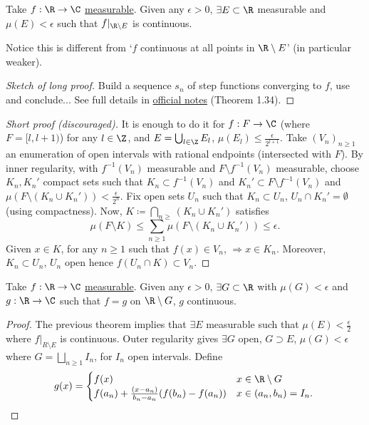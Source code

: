 \documentclass[twoside]{article}
\begin{document}
\begin{thm}
    Take $f: \R \to \C$ \hyperlink{def:measFunc}{measurable}.
    Given any $\epsilon > 0$, $\exists E \subset \R$ measurable and $\mu(E) < \epsilon$ such that $f|_{\R \setminus E}$ is continuous.
\end{thm}
\begin{remark}
    Notice this is different from `$f$ continuous at all points in $\R \setminus E$' (in particular weaker).
\end{remark}
\begin{proof}[Sketch of long proof]
    Build a sequence $s_n$ of step functions converging to $f$, use  and conclude... See full details in \href{https://cmouhot.files.wordpress.com/2017/01/notes-af-v21.pdf}{official notes} (Theorem 1.34).
\end{proof}
\begin{proof}[Short proof (discouraged)]
    It is enough to do it for $f: F \to \C$ (where $F = [l, l+1)$) for any $l \in \Z$, and $E = \bigcup_{l \in \Z} E_l$, $\mu(E_l) \leq \frac{\epsilon}{2^{l+1}}$.
    Take $(V_n)_{n \geq 1}$ an enumeration of open intervals with rational endpoints (intersected with $F$).
    By inner regularity, with $f^{-1}(V_n)$ measurable and $F \setminus f^{-1}(V_n)$ measurable, choose $K_n, K_n'$ compact sets such that $K_n \subset f^{-1}(V_n)$ and $K_n' \subset F\setminus f^{-1}(V_n)$ and $\mu(F \setminus (K_n \cup K_n')) < \frac{\epsilon}{2^n}$.
    Fix open sets $U_n$ such that $K_n \subset U_n$, $U_n \cap K_n' = \emptyset$ (using compactness).
    Now, $K \coloneqq \bigcap_{n \geq } (K_n \cup K_n')$ satisfies
    \begin{equation*}
        \mu(F \setminus K) \leq \sum_{n \geq 1} \mu(F \setminus (K_n \cup K_n')) \leq \epsilon.
    \end{equation*}
    Given $x \in K$, for any $n \geq 1$ such that $f(x) \in V_n$, $\Rightarrow x \in K_n$. Moreover, $K_n \subset U_n$, $U_n$ open hence $f(U_n \cap K) \subset V_n$.
\end{proof}
\begin{thm}
    Take $f: \R \to \C$ \hyperlink{def:measFunc}{measurable}.
    Given any $\epsilon > 0$, $\exists G \subset \R$ with $\mu(G) < \epsilon$ and $g: \R \to \C$ such that $f = g$ on $\R \setminus G$, $g$ continuous.
\end{thm}
\begin{proof}
    The previous theorem implies that $\exists E$ measurable such that $\mu(E) < \frac{\epsilon}{2}$ where $f|_{R \setminus E}$ is continuous.
    Outer regularity gives $\exists G$ open, $G \supset E$, $\mu(G) < \epsilon$ where $G = \bigsqcup_{n \geq 1} I_n$, for $I_n$ open intervals.
    Define
    \begin{equation*}
        g(x) =
        \begin{cases}
            f(x) & x \in \R \setminus G \\
            f(a_n) + \frac{(x-a_n)}{b_n - a_n} (f(b_n) - f(a_n)) & x \in (a_n, b_n)=I_n.
        \end{cases}\qedhere
    \end{equation*}
\end{proof}
\end{document}
